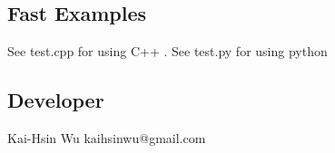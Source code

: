 \subsection*{Fast Examples}

\begin{DoxyVerb}See test.cpp for using C++ .
See test.py for using python  
\end{DoxyVerb}


\subsection*{Developer}

\begin{DoxyVerb}Kai-Hsin Wu kaihsinwu@gmail.com \end{DoxyVerb}
 